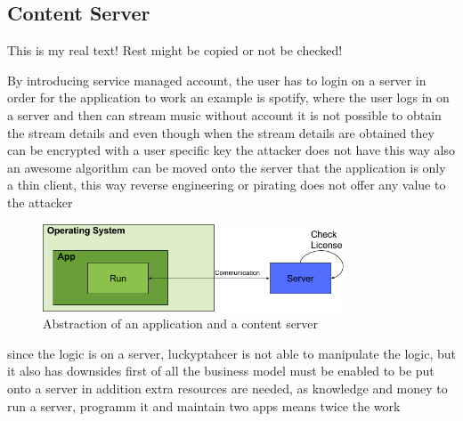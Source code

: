 \subsection{Content Server} \label{section:counter-replace-server}
This is my real text! Rest might be copied or not be checked!

By introducing service managed account, the user has to login on a server in order for the application to work
an example is spotify, where the user logs in on a server and then can stream music
without account it is not possible to obtain the stream details and even though when the stream details are obtained they can be encrypted with a user specific key the attacker does not have
this way also an awesome algorithm can be moved onto the server that the application is only a thin client, this way reverse engineering or pirating does not offer any value to the attacker


\begin{figure}[h]
    \centering
    \includegraphics[width=0.8\textwidth]{data/contentServer.png}
    \caption{Abstraction of an application and a content server}
    \label{fig:contentServer}
\end{figure}


since the logic is on a server, luckyptahcer is not able to manipulate the logic, but it also has downsides
first of all the business model must be enabled to be put onto a server
in addition extra resources are needed, as knowledge and money to run a server, programm it and maintain two apps means twice the work
